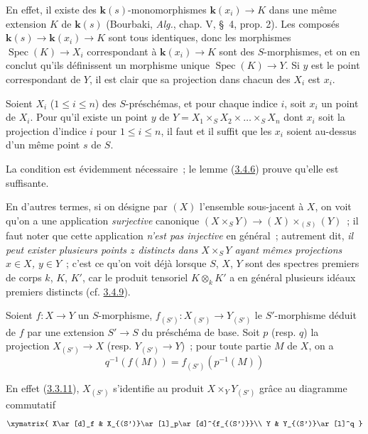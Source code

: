 En effet, il existe des $\boldsymbol{k}(s)$-monomorphismes $\boldsymbol{k}(x_i)\to K$ dans une même
extension $K$ de $\boldsymbol{k}(s)$ (Bourbaki, \emph{Alg.}, chap. V, \S~4, prop. 2). Les
composés $\boldsymbol{k}(s)\to \boldsymbol{k}(x_i)\to K$ sont tous identiques, donc les morphismes
$\operatorname{Spec}(K)\to X_i$ correspondant à $\boldsymbol{k}(x_i)\to K$ sont des
$S$-morphismes, et on en conclut qu'ils définissent un morphisme unique
$\operatorname{Spec}(K)\to Y$. Si $y$ est le point correspondant de $Y$, il
est clair que sa projection dans chacun des $X_i$ est $x_i$.

\begin{proposition}[3.4.7]
\label{I.3.4.7-fr}
Soient $X_i$ ($1\leq i\leq n$) des $S$-préschémas, et pour chaque indice $i$,
soit $x_i$ un point de $X_i$. Pour qu'il existe un point $y$ de
$Y=X_1\times_S X_2\times\ldots\times_S X_n$ dont $x_i$ soit la projection
d'indice $i$ pour $1\leq i\leq n$, il faut et il suffit que les $x_i$ soient
au-dessus d'un même point $s$ de $S$.
\end{proposition}

La condition est évidemment nécessaire~; le lemme
(\hyperref[I.3.4.6-fr]{3.4.6}) prouve qu'elle est suffisante.

\label{I.3.4.7.underlying-map-fr}
En d'autres termes, si on désigne par $(X)$ l'ensemble sous-jacent à $X$, on
voit qu'on a une application \emph{surjective} canonique
$(X\times_S Y)\to (X)\times_{(S)}(Y)$~; il faut noter que cette application
\emph{n'est pas injective} en général~; autrement dit, \emph{il peut exister
plusieurs points $z$ distincts dans $X\times_S Y$ ayant mêmes projections
$x\in X$, $y\in Y$}~; c'est ce qu'on voit déjà lorsque $S$, $X$, $Y$ sont des
spectres premiers de corps $k$, $K$, $K'$, car le produit tensoriel
$K\otimes_k K'$ a en général plusieurs idéaux premiers distincts
(cf. \hyperref[I.3.4.9-fr]{3.4.9}).

\begin{corollary}[3.4.8]
\label{I.3.4.8-fr}
Soient $f:X\to Y$ un $S$-morphisme, $f_{(S')}:X_{(S')}\to Y_{(S')}$ le
$S'$-morphisme déduit de $f$ par une extension $S'\to S$ du préschéma de base.
Soit $p$ (\textup{resp.} $q$) la projection $X_{(S')}\to X$ (\textup{resp.}
$Y_{(S')}\to Y$)~; pour toute partie $M$ de $X$, on a
\label{I.3.4.8.base-change-image-fr}
\[
  q^{-1}(f(M))=f_{(S')}(p^{-1}(M))
\]
\end{corollary}

En effet (\hyperref[I.3.3.11-fr]{3.3.11}), $X_{(S')}$ s'identifie au produit
$X\times_Y Y_{(S')}$ grâce au diagramme commutatif
\label{I.3.4.8.proof-diagram-fr}
\[
  \xymatrix{
    X\ar[d]_f & X_{(S')}\ar[l]_p\ar[d]^{f_{(S')}}\\
    Y & Y_{(S')}\ar[l]^q
  }
\]

